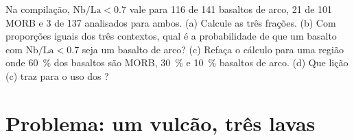 \begin{exercise}[$\star\star\star$]\label{exo:b2:magmatic-series:12}
Na compilação, $\mathrm{Nb}/\mathrm{La} < 0.7$ vale para 116 de 141 basaltos de arco,
21 de 101 MORB e 3 de 137  analisados para ambos. (a) Calcule as
três frações. (b) Com proporções iguais dos três contextos, qual é a
probabilidade de que um basalto com $\mathrm{Nb}/\mathrm{La} < 0.7$ seja um basalto de arco? (c)
Refaça o cálculo para uma região onde \qty{60}{\percent} dos basaltos são MORB, \qty{30}{\percent}
 e \qty{10}{\percent} basaltos de arco. (d) Que lição (c)
traz para o uso dos ?
\end{exercise}

\section{Problema: um vulcão, três lavas}

